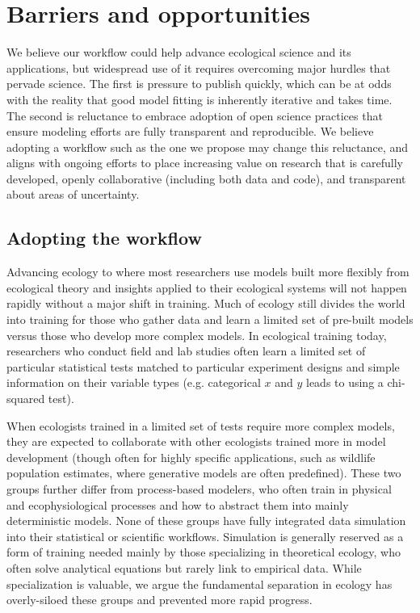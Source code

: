 \documentclass[11pt]{article}
\newcommand{\llabel}[1]{\hypertarget{lintarget:#1}{}\linelabel{lin:#1}}
\begin{document}
\clearpage
\section{Barriers and opportunities}

We believe our workflow could help advance ecological science and its applications, but widespread use of it requires overcoming major hurdles that pervade science.  
The first is pressure to publish quickly, which can be at odds with the reality that good model fitting is inherently iterative and takes time. The second is reluctance to embrace adoption of open science practices that ensure modeling efforts are fully transparent and reproducible. 
We believe adopting a workflow such as the one we propose may change this reluctance, and aligns with ongoing efforts to place increasing value on research that is carefully developed, openly collaborative (including both data and code), and transparent about areas of uncertainty.

\subsection{Adopting the workflow}

Advancing ecology to where most researchers use models built more flexibly from ecological theory and insights applied to their ecological systems will not happen rapidly without a major shift in training. Much of ecology still divides the world into training for those who gather data and learn a limited set of pre-built models versus those who develop more complex models. In ecological training today, researchers who conduct field and lab studies often learn a limited set of particular statistical tests matched to particular experiment designs and simple information on their variable types (e.g. categorical $x$ and $y$ leads to using a chi-squared test).

When ecologists trained in a limited set of tests require more complex models, they are expected to collaborate with other ecologists \llabel{collab1} trained more in model development (though often for highly specific applications, such as wildlife population estimates, where generative models are often predefined). These two groups further differ from process-based modelers, who often train in physical and ecophysiological processes and how to abstract them into mainly deterministic models.
None of these groups have fully integrated data simulation into their statistical or scientific workflows. Simulation is generally reserved as a form of training needed mainly by those specializing in theoretical ecology, who often solve analytical equations but rarely link to empirical data. While specialization is valuable, we argue the fundamental %
separation in ecology has overly-siloed these groups and prevented more rapid progress.
\end{document}
